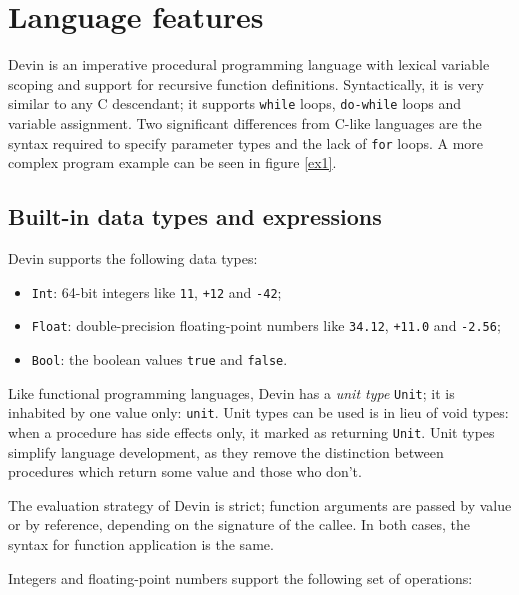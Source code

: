 \documentclass[11pt, american, draft]{PhdThesis}
\begin{document}
  \section{Language features}

  Devin is an imperative procedural programming language with lexical variable scoping and support
  for recursive function definitions. Syntactically, it is very similar to any C descendant; it
  supports \verb$while$ loops, \verb$do-while$ loops and variable assignment. Two significant
  differences from C-like languages are the syntax required to specify parameter types and the lack
  of \verb$for$ loops. A more complex program example can be seen in figure \ref{ex1}.

  \subsection{Built-in data types and expressions}

  Devin supports the following data types:

  \begin{itemize}[noitemsep,topsep=0pt]
    \item \verb$Int$: 64-bit integers like \verb$11$, \verb$+12$ and \verb$-42$;

    \item \verb$Float$: double-precision floating-point numbers like \verb$34.12$, \verb$+11.0$ and
          \verb$-2.56$;

    \item \verb$Bool$: the boolean values \verb$true$ and \verb$false$.
  \end{itemize}

  Like functional programming languages, Devin has a \emph{unit type} \verb$Unit$; it is inhabited
  by one value only: \verb$unit$. Unit types can be used is in lieu of void types: when a
  procedure has side effects only, it marked as returning \verb$Unit$. Unit types simplify language
  development, as they remove the distinction between procedures which return some value
  and those who don't.

  The evaluation strategy of Devin is strict; function arguments are passed by value or by
  reference, depending on the signature of the callee. In both cases, the syntax for function
  application is the same.

  Integers and floating-point numbers support the following set of operations:
\end{document}
